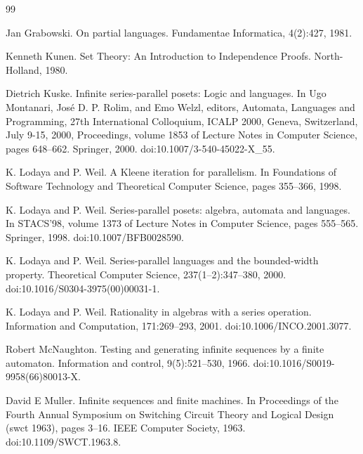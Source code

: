 \documentclass[10pt,a4paper]{article}
\begin{document}
\begin{thebibliography}{99}
\par\noindent    Jan Grabowski.  On partial languages.  Fundamentae Informatica, 4(2):427, 1981.  

\par\noindent    Kenneth Kunen.  Set Theory: An Introduction to Independence Proofs.  North-Holland, 1980.  

\par\noindent    Dietrich Kuske.  Infinite series-parallel posets: Logic and languages.  In Ugo Montanari, José D. P. Rolim, and Emo Welzl, editors, Automata, Languages and Programming, 27th International Colloquium, ICALP 2000, Geneva, Switzerland, July 9-15, 2000, Proceedings, volume 1853 of Lecture Notes in Computer Science, pages 648–662. Springer, 2000.  doi:10.1007/3-540-45022-X\_55.  

\par\noindent    K. Lodaya and P. Weil.  A Kleene iteration for parallelism.  In Foundations of Software Technology and Theoretical Computer Science, pages 355–366, 1998.  

\par\noindent    K. Lodaya and P. Weil.  Series-parallel posets: algebra, automata and languages.  In STACS’98, volume 1373 of Lecture Notes in Computer Science, pages 555–565. Springer, 1998.  doi:10.1007/BFB0028590.  

\par\noindent    K. Lodaya and P. Weil.  Series-parallel languages and the bounded-width property.  Theoretical Computer Science, 237(1–2):347–380, 2000.  doi:10.1016/S0304-3975(00)00031-1.  

\par\noindent    K. Lodaya and P. Weil.  Rationality in algebras with a series operation.  Information and Computation, 171:269–293, 2001.  doi:10.1006/INCO.2001.3077.  

\par\noindent    Robert McNaughton.  Testing and generating infinite sequences by a finite automaton.  Information and control, 9(5):521–530, 1966.  doi:10.1016/S0019-9958(66)80013-X.  

\par\noindent    David E Muller.  Infinite sequences and finite machines.  In Proceedings of the Fourth Annual Symposium on Switching Circuit Theory and Logical Design (swct 1963), pages 3–16. IEEE Computer Society, 1963.  doi:10.1109/SWCT.1963.8.  


\end{thebibliography}
\end{document}

